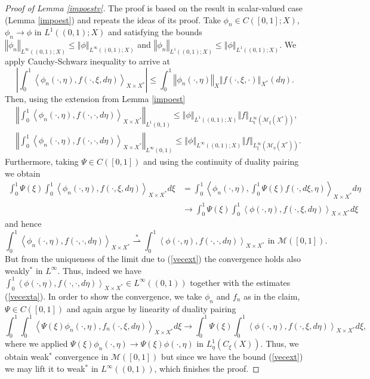\documentclass[10pt]{article}
\newcommand{\m}[1]{\mbox{#1}}
\newcommand*{\norm}[1]{\left\Vert{#1}\right\Vert}
\newcommand*{\abs}[1]{\left\vert{#1}\right\vert}
\newcommand{\izj}{\int_{0}^{1}}
\begin{document}
\begin{proof}[Proof of Lemma \ref{impoestv}]
The proof is based on the result in scalar-valued case (Lemma \ref{impoest}) and repeats the ideas of its proof. Take $\phi_n \in C([0,1];X)$, $\phi_n\rightarrow \phi$ in $L^1((0,1);X)$ and satisfying the bounds $\norm{\phi_n}_{L^{\infty}((0,1);X)} \leq \norm{\phi}_{L^{\infty}((0,1);X)}$ and $\norm{\phi_n}_{L^{1}((0,1);X)} \leq \norm{\phi}_{L^{1}((0,1);X)}$. We apply Cauchy-Schwarz inequality  to arrive at
\[
\abs{\izj \left\langle \phi_n(\cdot,\eta),f(\cdot,\xi,d\eta)\right\rangle_{X\times X^*}} \leq \izj \norm{\phi_n(\cdot,\eta)}_{X}\norm{f(\cdot,\xi,\cdot)}_{X^*}(d\eta).
\]
Then, using the extension from Lemma \ref{impoest}
\begin{align} \label{vecext} \nonumber
    &\norm{\izj \left\langle \phi_n(\cdot,\eta),f(\cdot,\cdot,d\eta)\right\rangle_{X\times X^*}}_{L^{1}(0,1)} \leq  \norm{\phi}_{L^{1}((0,1);X)}\norm{f}_{L^{\infty}_\eta(\mathcal{M}_{\xi}(X^*))},\\ 
    &\norm{\izj \left\langle \phi_n(\cdot,\eta),f(\cdot,\cdot,d\eta)\right\rangle_{X\times X^*}}_{L^{\infty}(0,1)} \leq  \norm{\phi}_{L^{\infty}((0,1);X)}\norm{f}_{L^{\infty}_\xi(\mathcal{M}_{\eta}(X^*))}.
\end{align}
Furthermore, taking $\Psi \in C([0,1])$ and using the continuity of duality pairing we obtain
\begin{align*}
  \izj \Psi(\xi) \izj \left\langle \phi_n(\cdot,\eta),f(\cdot,\xi,d\eta)\right\rangle_{X\times X^*} d\xi& = \izj \left\langle \phi_n(\cdot,\eta),\izj \Psi(\xi)f(\cdot,d\xi,\eta)\right\rangle_{X\times X^*}d\eta   \\
  & \rightarrow \izj \Psi(\xi) \izj \left\langle \phi(\cdot,\eta),f(\cdot,\xi,d\eta)\right\rangle_{X\times X^*} d\xi
\end{align*}
and hence 
\[
\izj \left\langle \phi_n(\cdot,\eta),f(\cdot,\cdot,d\eta)\right\rangle_{X\times X^*} \overset{*}{\rightharpoonup} \izj \left\langle \phi(\cdot,\eta),f(\cdot,\cdot,d\eta)\right\rangle_{X\times X^*} \m{ in } \mathcal{M}([0,1]).
\]
But from the uniqueness of the limit due to (\ref{vecext}) the convergence holds also weakly$^*$ in $L^{\infty}$. Thus, indeed we have $\izj \left\langle \phi(\cdot,\eta),f(\cdot,\cdot,d\eta)\right\rangle_{X\times X^*} \in L^{\infty}((0,1))$
together with the estimates (\ref{vecexta}). In order to show the convergence, we take $\phi_n$ and $f_n$ as in the claim, $\Psi \in C([0,1])$ and again argue by linearity of duality pairing
\[
\izj \izj \left\langle \Psi(\xi)\phi_n(\cdot,\eta),f_n(\cdot,\xi,d\eta)\right\rangle_{X\times X^*} d\xi \rightarrow \izj \Psi(\xi)\izj \left\langle \phi(\cdot,\eta),f(\cdot,\xi,d\eta)\right\rangle_{X\times X^*} d\xi, 
\]
where we applied $\Psi(\xi)\phi_n(\cdot,\eta) \rightarrow \Psi(\xi)\phi(\cdot,\eta)$ in $L^{1}_\eta(C_\xi(X))$. Thus, we obtain weak$^*$ convergence in $\mathcal{M}([0,1])$ but since we have the bound (\ref{vecext}) we may lift it to weak$^*$ in $L^{\infty}((0,1))$, which finishes the proof.
\end{proof}
\end{document}
